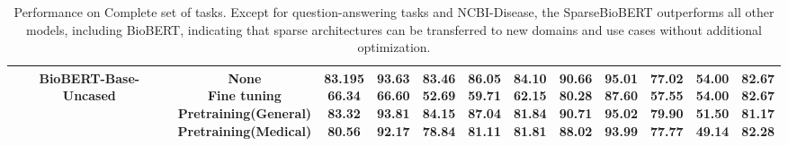 \begin{table*}[htb!]
{\begin{tabular}{cc|ccccc|ccc|cc}
    \midrule
    BioBERT-Base-Uncased &  \makecell{None \\ Fine tuning \\ Pretraining(General) \\ Pretraining(Medical)}  &\makecell{83.195 \\ 66.34 \\\textbf{83.32} \\ 80.56 } &  \makecell{93.63 \\ 66.60 \\ \textbf{93.81} \\92.17 } & \makecell{83.46 \\ 52.69 \\ 84.15 \\ 78.84}&  \makecell{86.05 \\ 59.71 \\\textbf{87.04} \\ 81.11} &  \makecell{\textbf{84.10} \\62.15 \\ 81.84 \\ 81.81 } &   \makecell{90.66 \\ 80.28 \\ \textbf{90.71} \\ 88.02} &  \makecell{95.01 \\ 87.60  \\ \textbf{95.02} \\ 93.99} &  \makecell{77.02 \\ 57.55 \\ \textbf{79.90} \\ 77.77} &   \makecell{\textbf{54.00}\\ \textbf{54.00} \\ 51.50 \\ 49.14} &  \makecell{\textbf{82.67}\\ \textbf{82.67} \\ 81.17 \\ 82.28} \\
    \bottomrule
    \end{tabular}
    }
    \caption{Performance on Complete set of tasks. Except for question-answering tasks and NCBI-Disease, the SparseBioBERT outperforms all other models, including BioBERT, indicating that sparse architectures can be transferred to new domains and use cases without additional optimization. }
    \label{tab:full}
    \vspace{-1.2em}
\end{table*}
